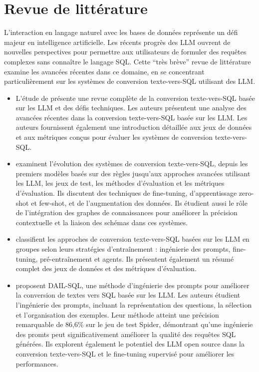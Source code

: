 \documentclass[a4paper,11pt]{article}
\begin{document}
\section{Revue de littérature}
\label{sec:revue}

L'interaction en langage naturel avec les bases de données représente un défi majeur en intelligence artificielle. Les récents progrès des LLM ouvrent de nouvelles perspectives pour permettre aux utilisateurs de formuler des requêtes complexes sans connaître le langage SQL. Cette \enquote{très brève} 
revue de littérature examine les avancées récentes dans ce domaine, en se concentrant particulièrement sur les systèmes de conversion texte-vers-SQL utilisant des LLM.

\begin{itemize}
    \item L'étude de \citet{hong2024next} présente une revue complète de la conversion texte-vers-SQL basée sur les LLM et des défis techniques. Les auteurs présentent 
    une analyse des avancées récentes dans la conversion texte-vers-SQL basée sur les LLM.
    Les auteurs 
    fournissent également une introduction détaillée aux jeux de données
    et aux métriques conçus pour évaluer les systèmes de conversion texte-vers-SQL. 

    \item \citet{mohammadjafari2024natural} examinent l'évolution des systèmes de conversion texte-vers-SQL, 
    depuis les premiers modèles basés sur des règles jusqu'aux approches avancées utilisant les LLM, les jeux de test, les méthodes d'évaluation et les métriques d'évaluation. 
    Ils discutent des techniques de fine-tuning, d'apprentissage zero-shot et few-shot, et de l'augmentation des données.
    Ils étudient aussi le rôle de l'intégration des graphes de connaissances pour améliorer la précision contextuelle et la liaison des schémas dans ces systèmes. 

    \item \citet{zhu2024large} classifient les approches de conversion texte-vers-SQL basées sur les LLM en groupes selon leurs stratégies d'entraînement : ingénierie des prompts, fine-tuning, pré-entraînement et agents. Ils présentent également un résumé complet des jeux de données et des métriques d'évaluation. 
    
    \item \citet{gao2023text} proposent DAIL-SQL, une méthode d'ingénierie des prompts pour améliorer la conversion de textes vers SQL basée sur les LLM. 
    Les auteurs étudient l'ingénierie des prompts, incluant la représentation des questions, la sélection et l'organisation des exemples. 
    Leur méthode atteint une précision remarquable de 86,6\% sur le jeu de test Spider, démontrant qu'une ingénierie des promts peut significativement améliorer la qualité des requêtes SQL générées. Ils explorent également le potentiel des LLM open source dans la conversion texte-vers-SQL et le fine-tuning supervisé pour améliorer les performances. 


\end{itemize}
\end{document}
